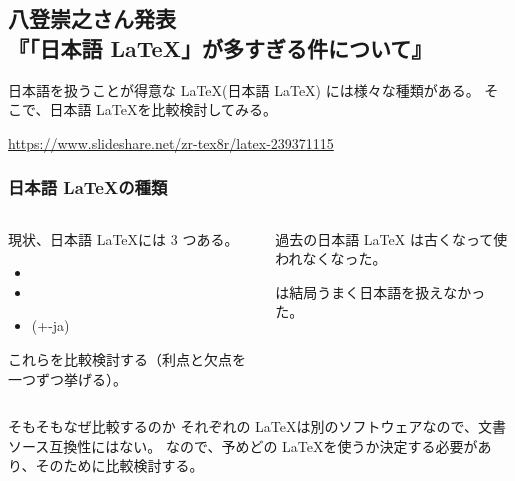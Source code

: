 \documentclass[aspectratio=149]{beamer}
\newcommand{\hmemph}[1]{\textbf{#1}}
\begin{document}
\begin{frame}
	\section{八登崇之さん発表\\『「日本語 LaTeX」が多すぎる件について』}
	
	日本語を扱うことが得意な \LaTeX (日本語 \LaTeX) には様々な種類がある。
	そこで、日本語 \LaTeX を比較検討してみる。
	
	\url{https://www.slideshare.net/zr-tex8r/latex-239371115}
\end{frame}

\begin{frame}
	\frametitle{日本語 \LaTeX の種類}
	\begin{columns}
		\begin{column}{.5\textwidth}
			現状、日本語 \LaTeX には 3 つある。
			
			\begin{itemize}
				\item \pLaTeX
				\item \upLaTeX
				\item \LuaLaTeX(+\LuaTeX-ja)
			\end{itemize}
			
			これらを比較検討する（利点と欠点を一つずつ挙げる）。
		\end{column}
		\begin{column}{.49\textwidth}
			\begin{block}{過去の日本語 \LaTeX}
				\hmemph{\JLaTeX} は古くなって使われなくなった。
				
				\hmemph{\XeLaTeX} は結局うまく日本語を扱えなかった。
			\end{block}
		\end{column}
	\end{columns}
	\begin{block}{そもそもなぜ比較するのか}
		それぞれの \LaTeX は別のソフトウェアなので、文書ソース互換性にはない。
		なので、予めどの \LaTeX を使うか決定する必要があり、そのために比較検討する。
	\end{block}
\end{frame}
\end{document}
